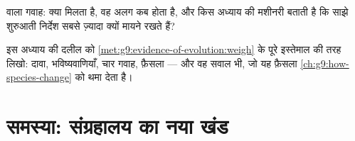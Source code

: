 \begin{exercise}[$\star\star$]\label{exo:g9:evidence-of-evolution:11}
 वाला गवाह: क्या मिलता है, वह अलग कब होता है, और किस अध्याय की
मशीनरी बताती है कि साझे शुरुआती निर्देश सबसे ज़्यादा क्यों मायने रखते
हैं?
\end{exercise}

\begin{exercise}[$\star\star\star$]\label{exo:g9:evidence-of-evolution:12}
इस अध्याय की दलील को \cref{met:g9:evidence-of-evolution:weigh} के पूरे
इस्तेमाल की तरह लिखो: दावा, भविष्यवाणियाँ, चार गवाह, फ़ैसला --- और वह
सवाल भी, जो यह फ़ैसला \cref{ch:g9:how-species-change} को थमा देता है।
\end{exercise}

\section{समस्या: संग्रहालय का नया खंड}

